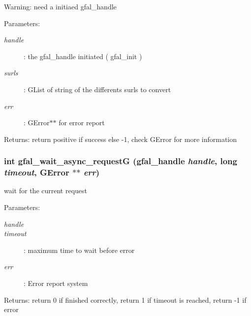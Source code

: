 \begin{Desc}
\item[Warning:]need a initiaed gfal\_\-handle \end{Desc}
\begin{Desc}
\item[Parameters:]
\begin{description}
\item[{\em handle}]: the gfal\_\-handle initiated ( gfal\_\-init ) \item[{\em surls}]: GList of string of the differents surls to convert \item[{\em err}]: GError$\ast$$\ast$ for error report \end{description}
\end{Desc}
\begin{Desc}
\item[Returns:]return positive if success else -1, check GError for more information \end{Desc}
\subsubsection{\setlength{\rightskip}{0pt plus 5cm}int gfal\_\-wait\_\-async\_\-request\-G (gfal\_\-handle {\em handle}, long {\em timeout}, GError $\ast$$\ast$ {\em err})}\label{gfal__common__srm_8h_86890a00f72d9af9ab88f42a69e3bf8c}


wait for the current request 

\begin{Desc}
\item[Parameters:]
\begin{description}
\item[{\em handle}]\item[{\em timeout}]: maximum time to wait before error \item[{\em err}]: Error report system \end{description}
\end{Desc}
\begin{Desc}
\item[Returns:]return 0 if finished correctly, return 1 if timeout is reached, return -1 if error \end{Desc}
